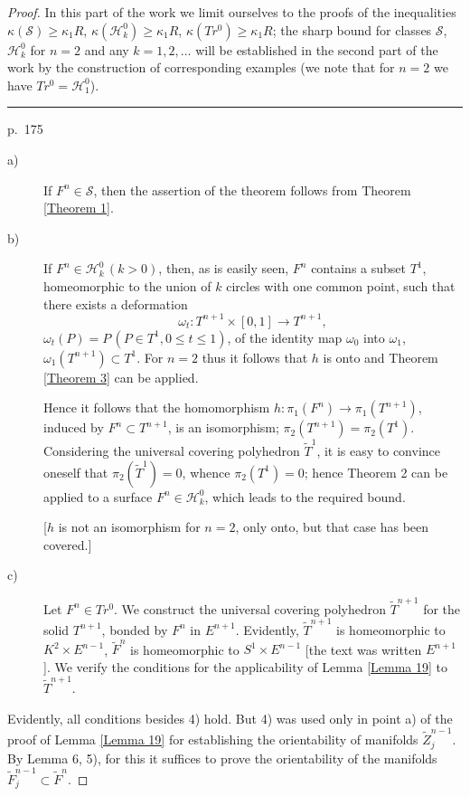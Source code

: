 \documentclass{amsart}
\theoremstyle{plain}
\theoremstyle{definition}
\begin{document}
\begin{proof} In this part of the work we limit ourselves
to the proofs of the inequalities $\kappa(\mathcal{S}) \ge
\kappa_1R$, $\kappa(\mathcal{H}^0_k) \ge \kappa_1R$,
$\kappa(Tr^0) \ge \kappa_1R$; the sharp bound for classes
$\mathcal{S}$, $\mathcal{H}^0_k$ for $n=2$ and any $k = 1, 2, \ldots$
will be established in the second part of the work by the
construction of corresponding examples (we note that for
$n = 2$ we have $Tr^0 = \mathcal{H}^0_1$).

\medskip
\hrule\smallskip
\noindent p.~175
\medskip

\begin{description}
\item[a)] If $F^n \in \mathcal{S}$, then the assertion of the theorem
follows from Theorem \ref{Theorem 1}.
\item[b)] If $F^n \in \mathcal{H}^0_k \, (k>0)$, then, as is easily
seen, $F^n$ contains a subset $T^1$, homeomorphic to the
union of $k$ circles with one common point, such that there
exists a deformation 
$$\omega_t: T^{n+1} \times [0,1] \to T^{n+1},$$
$\omega_t(P) = P \, (P \in T^1, 0 \le t \le 1)$, of the identity
map $\omega_0$ into $\omega_1$, $\omega_1(T^{n+1})
\subset T^1$. For $n = 2$ thus it follows that $h$ is onto
and Theorem \ref{Theorem 3} can be applied.

Hence it follows that the homomorphism $h : \pi_1(F^n) \to
\pi_1(T^{n+1})$, induced by $F^n \subset T^{n+1}$, is an
isomorphism; $\pi_2(T^{n+1}) = \pi_2(T^1)$. Considering
the universal covering polyhedron $\tilde T^1$, it is easy
to convince oneself that $\pi_2(\tilde T^1) = 0$, whence
$\pi_2(T^1) = 0$; hence Theorem 2 can be applied to a surface
$F^n \in \mathcal{H}^0_k$, which leads to the required bound.

[$h$ is not an isomorphism for $n = 2$, only onto, but that
case has been covered.]

\item[c)] Let $F^n \in Tr^0$. We construct the universal
covering polyhedron $\tilde T^{n+1}$ for the solid $T^{n+1}$,
bonded by $F^n$ in $E^{n+1}$. Evidently, $\tilde T^{n+1}$ is
homeomorphic to $K^2 \times E^{n-1}$, $\tilde F^n$ is
homeomorphic to $S^1 \times E^{n-1}$ [the text was written
$E^{n+1}$]. We verify the conditions for the applicability
of Lemma \ref{Lemma 19} to $\tilde T^{n+1}$.
\end{description}

Evidently, all conditions besides 4) hold. But 4) was used
only in point a) of the proof of Lemma \ref{Lemma 19} for establishing
the orientability of manifolds $\tilde Z^{n-1}_j$. By Lemma
6, 5), for this it suffices to prove the orientability of the
manifolds $\tilde F^{n-1}_j \subset \tilde F^n$.


\end{proof}
\end{document}
